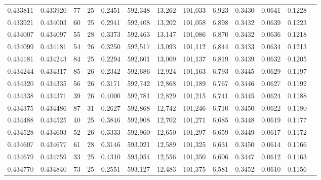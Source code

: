 \begin{tabular}{rrrrrrrrrrrrr}
0.433811 & 0.433920 &    77 &  25 &                                     0.2451 & 592,348 &  13,262 & 101,033 &   6,923 & 0.3430 & 0.0641 & 0.1228 \\
0.433921 & 0.434003 &    60 &  25 &                                     0.2941 & 592,408 &  13,202 & 101,058 &   6,898 & 0.3432 & 0.0639 & 0.1223 \\
0.434007 & 0.434097 &    55 &  28 &                                     0.3373 & 592,463 &  13,147 & 101,086 &   6,870 & 0.3432 & 0.0636 & 0.1218 \\
0.434099 & 0.434181 &    54 &  26 &                                     0.3250 & 592,517 &  13,093 & 101,112 &   6,844 & 0.3433 & 0.0634 & 0.1213 \\
0.434181 & 0.434243 &    84 &  25 &                                     0.2294 & 592,601 &  13,009 & 101,137 &   6,819 & 0.3439 & 0.0632 & 0.1205 \\
0.434244 & 0.434317 &    85 &  26 &                                     0.2342 & 592,686 &  12,924 & 101,163 &   6,793 & 0.3445 & 0.0629 & 0.1197 \\
0.434320 & 0.434335 &    56 &  26 &                                     0.3171 & 592,742 &  12,868 & 101,189 &   6,767 & 0.3446 & 0.0627 & 0.1192 \\
0.434338 & 0.434371 &    39 &  26 &                                     0.4000 & 592,781 &  12,829 & 101,215 &   6,741 & 0.3445 & 0.0624 & 0.1188 \\
0.434375 & 0.434486 &    87 &  31 &                                     0.2627 & 592,868 &  12,742 & 101,246 &   6,710 & 0.3450 & 0.0622 & 0.1180 \\
0.434488 & 0.434525 &    40 &  25 &                                     0.3846 & 592,908 &  12,702 & 101,271 &   6,685 & 0.3448 & 0.0619 & 0.1177 \\
0.434528 & 0.434603 &    52 &  26 &                                     0.3333 & 592,960 &  12,650 & 101,297 &   6,659 & 0.3449 & 0.0617 & 0.1172 \\
0.434607 & 0.434677 &    61 &  28 &                                     0.3146 & 593,021 &  12,589 & 101,325 &   6,631 & 0.3450 & 0.0614 & 0.1166 \\
0.434679 & 0.434759 &    33 &  25 &                                     0.4310 & 593,054 &  12,556 & 101,350 &   6,606 & 0.3447 & 0.0612 & 0.1163 \\
0.434770 & 0.434840 &    73 &  25 &                                     0.2551 & 593,127 &  12,483 & 101,375 &   6,581 & 0.3452 & 0.0610 & 0.1156 \\

\end{tabular}
